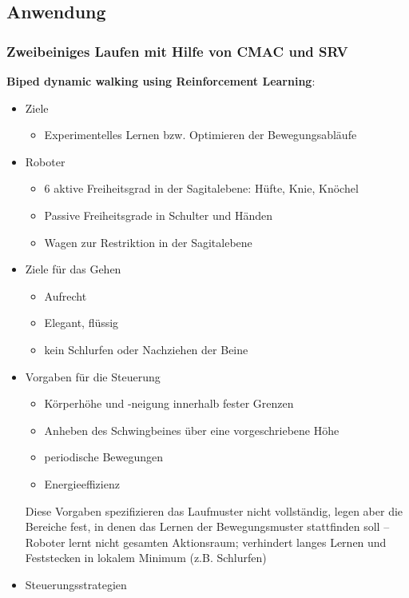 \subsection{Anwendung}


\subsubsection{Zweibeiniges Laufen mit Hilfe von CMAC und SRV}

\textbf{Biped dynamic walking using Reinforcement Learning}:\\
\begin{itemize}
	\item Ziele
	\begin{itemize}
		\item Experimentelles Lernen bzw. Optimieren der Bewegungsabläufe	
	\end{itemize}
	\item Roboter
	\begin{itemize}
		\item 6 aktive Freiheitsgrad in der Sagitalebene: Hüfte, Knie, Knöchel
		\item Passive Freiheitsgrade in Schulter und Händen
		\item Wagen zur Restriktion in der Sagitalebene
	\end{itemize}
	\item Ziele für das Gehen
	\begin{itemize}
		\item Aufrecht
		\item Elegant, flüssig
		\item kein Schlurfen oder Nachziehen der Beine
	\end{itemize}
	\item Vorgaben für die Steuerung
	\begin{itemize}
		\item Körperhöhe und -neigung innerhalb fester Grenzen
		\item Anheben des Schwingbeines über eine vorgeschriebene Höhe
		\item periodische Bewegungen
		\item Energieeffizienz
	\end{itemize}
	Diese Vorgaben spezifizieren das Laufmuster nicht vollständig, legen aber die Bereiche fest, in denen das Lernen der Bewegungsmuster stattfinden soll -- Roboter lernt nicht gesamten Aktionsraum; 		verhindert langes Lernen und Feststecken in lokalem Minimum (z.B. \glqq Schlurfen\grqq)
	\item Steuerungsstrategien

\end{itemize}
